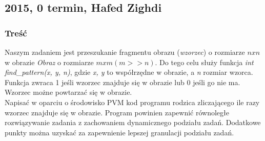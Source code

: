 		\subsection{2015, 0 termin, Hafed Zighdi}
			\subsubsection{Treść}
				Naszym zadaniem jest przeszukanie fragmentu obrazu (\textit{wzorzec}) o rozmiarze $ nxn $ w obrazie 	\textit{Obraz} o rozmiarze $ mxm (m>>n) $. 
				Do tego celu służy funkcja \textit{int find\_pattern(x, y, n)}, gdzie \textit{x, y} to współrzędne w obrazie, a \textit{n} rozmiar wzorca. 
				Funkcja zwraca 1 jeśli wzorzec znajduje się w obrazie lub 0 jeśli go nie ma. Wzorzec możne powtarzać się w obrazie. \\
				Napisać w oparciu o środowisko PVM kod programu rodzica zliczającego ile razy wzorzec znajduje się w obrazie. Program powinien zapewnić równoległe rozwiązywanie zadania z zachowaniem dynamicznego podziału zadań. Dodatkowe punkty można uzyskać za zapewnienie lepszej granulacji podziału zadań.
